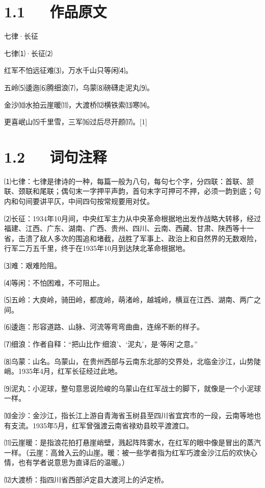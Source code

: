 \documentclass[letterpaper,12pt,english]{sphinxmanual}
\begin{document}
\section{1.1   作品原文}
\label{\detokenize{p01_u6563_u6587/_u6bdb_u6cfd_u4e1c-_u4e03_u5f8b_xb7_u957f_u5f81:id3}}
七律·长征

七律⑴·长征⑵

红军不怕远征难⑶，万水千山只等闲⑷。

五岭⑸逶迤⑹腾细浪⑺，乌蒙⑻磅礴走泥丸⑼。

金沙⑽水拍云崖暖⑾，大渡桥⑿横铁索⒀寒⒁。

更喜岷山⒂千里雪，三军⒃过后尽开颜⒄。{[}1{]}


\section{1.2   词句注释}
\label{\detokenize{p01_u6563_u6587/_u6bdb_u6cfd_u4e1c-_u4e03_u5f8b_xb7_u957f_u5f81:id4}}
⑴七律：七律是律诗的一种，每篇一般为八句，每句七个字，分四联：首联、颔联、颈联和尾联；偶句末一字押平声韵，首句末字可押可不押，必须一韵到底；句内和句间要讲平仄，中间四句按常规要用对仗。

⑵长征：1934年10月间，中央红军主力从中央革命根据地出发作战略大转移，经过福建、江西、广东、湖南、广西、贵州、四川、云南、西藏、甘肃、陕西等十一省，击溃了敌人多次的围追和堵截，战胜了军事上、政治上和自然界的无数艰险，行军二万五千里，终于在1935年10月到达陕北革命根据地。

⑶难：艰难险阻。

⑷等闲：不怕困难，不可阻止。

⑸五岭：大庾岭，骑田岭，都庞岭，萌渚岭，越城岭，横亘在江西、湖南、两广之间。

⑹逶迤：形容道路、山脉、河流等弯弯曲曲，连绵不断的样子。

⑺细浪：作者自释：“把山比作‘细浪’、‘泥丸’，是‘等闲’之意。”

⑻乌蒙：山名。乌蒙山，在贵州西部与云南东北部的交界处，北临金沙江，山势陡峭。1935年4月，红军长征经过此地。

⑼泥丸：小泥球，整句意思说险峻的乌蒙山在红军战士的脚下，就像是一个小泥球一样。

⑽金沙：金沙江，指长江上游自青海省玉树县至四川省宜宾市的一段，云南等地也有支流。1935年5月，红军曾强渡云南省禄劝县皎平渡渡口。

⑾云崖暖：是指浪花拍打悬崖峭壁，溅起阵阵雾水，在红军的眼中像是冒出的蒸汽一样。（云崖：高耸入云的山崖。暖：被一些学者指为红军巧渡金沙江后的欢快心情，也有学者说意思为直译后的温暖。）

⑿大渡桥：指四川省西部泸定县大渡河上的泸定桥。
\end{document}
